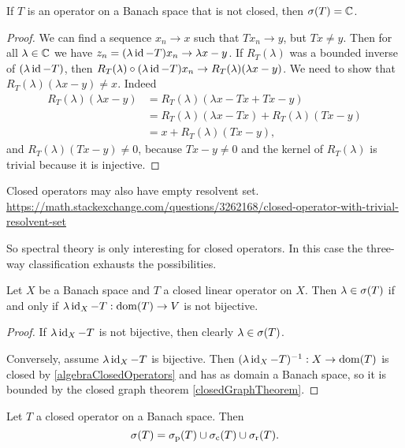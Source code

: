 \begin{proposition}
If $T$ is an operator on a Banach space that is not closed, then $\sigma(T) = \mathbb{C}$.
\end{proposition}
\begin{proof}
We can find a sequence $x_n \to x$ such that $Tx_n \to y$, but $Tx \neq y$. Then for all $\lambda\in\mathbb{C}$ we have $z_n = (\lambda\operatorname{id} - T)x_n \to \lambda x - y$. If $R_T(\lambda)$ was a bounded inverse of $(\lambda\operatorname{id} - T)$, then $R_T(\lambda)\circ(\lambda\operatorname{id} - T)x_n \to R_T(\lambda)(\lambda x - y)$. We need to show that $R_T(\lambda)(\lambda x - y) \neq x$. Indeed
\begin{align*}
R_T(\lambda)(\lambda x - y) &= R_T(\lambda)(\lambda x - Tx + Tx - y) \\
&= R_T(\lambda)(\lambda x - Tx) + R_T(\lambda)(Tx - y) \\
&= x + R_T(\lambda)(Tx - y),
\end{align*}
and $R_T(\lambda)(Tx - y) \neq 0$, because $Tx - y \neq 0$ and the kernel of $R_T(\lambda)$ is trivial because it is injective. 
\end{proof}

\begin{example}
Closed operators may also have empty resolvent set. \url{https://math.stackexchange.com/questions/3262168/closed-operator-with-trivial-resolvent-set}
\end{example}

So spectral theory is only interesting for closed operators. In this case the three-way classification exhausts the possibilities.

\begin{proposition}
Let $X$ be a Banach space and $T$ a closed linear operator on $X$. Then $\lambda \in \sigma(T)$ \textup{if and only if} $\lambda \operatorname{id}_X - T: \operatorname{dom}(T) \to V$ is not bijective.
\end{proposition}
\begin{proof}
If $\lambda \operatorname{id}_X - T$ is not bijective, then clearly $\lambda \in \sigma(T)$.

Conversely, assume $\lambda \operatorname{id}_X - T$ is bijective. Then $(\lambda \operatorname{id}_X - T)^{-1}: X\to \operatorname{dom}(T)$ is closed by \ref{algebraClosedOperators} and has as domain a Banach space, so it is bounded by the closed graph theorem \ref{closedGraphTheorem}.
\end{proof}
\begin{corollary}
Let $T$ a closed operator on a Banach space. Then
\[ \sigma(T) = \sigma_\text{p}(T) \cup \sigma_\text{c}(T) \cup \sigma_\text{r}(T). \]
\end{corollary}


